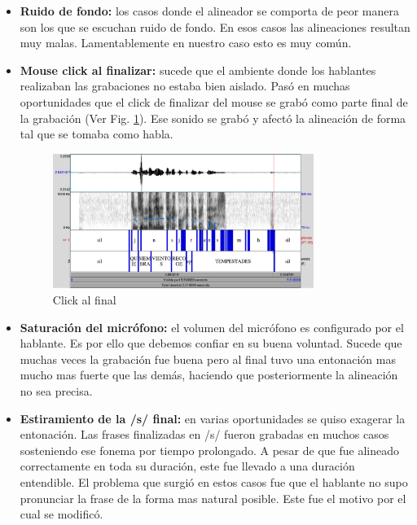 \documentclass[11pt,a4paper,twoside]{tesis}
\begin{document}
\begin{itemize}
    \item \textbf{Ruido de fondo:} los casos donde el alineador se comporta de peor manera son los que se escuchan ruido de fondo. En esos casos las alineaciones resultan muy malas. Lamentablemente en nuestro caso esto es muy común. 

    \item \textbf{Mouse click al finalizar:} sucede que el ambiente donde los hablantes realizaban las grabaciones no estaba bien aislado. Pasó en muchas oportunidades que el click de finalizar del mouse se grabó como parte final de la grabación (Ver Fig. \ref{click_final}). Ese sonido se grabó y afectó la alineación de forma tal que se tomaba como habla.
    
\begin{figure}[h!]
    \centerline{\includegraphics[width=0.8\textwidth]{click_al_final_inf} }
    \caption{Click al final}
    \label{click_final}
\end{figure}

    \item \textbf{Saturación del micrófono:} el volumen del micrófono es configurado por el hablante. Es por ello que debemos confiar en su buena voluntad. Sucede que muchas veces la grabación fue buena pero al final tuvo una entonación mas mucho mas fuerte que las demás, haciendo que posteriormente la alineación no sea precisa.

    \item \textbf{Estiramiento de la /s/ final:} en varias oportunidades se quiso exagerar la entonación. Las frases finalizadas en /s/ fueron grabadas en muchos casos sosteniendo ese fonema por tiempo prolongado. A pesar de que fue alineado correctamente en toda su duración, este fue llevado a una duración entendible. El problema que surgió en estos casos fue que el hablante no supo pronunciar la frase de la forma mas natural posible. Este fue el motivo por el cual se modificó.
\end{itemize}
\end{document}
